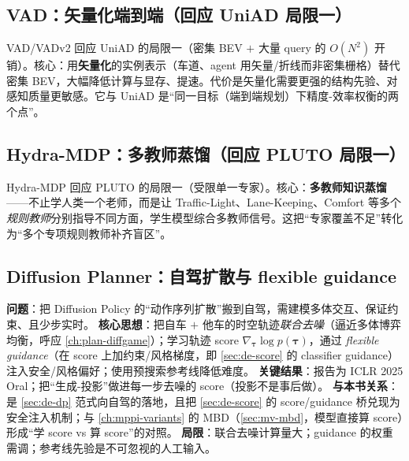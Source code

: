 \subsection{VAD：矢量化端到端（回应 UniAD 局限一）}
\label{sec:de-vad}

VAD/VADv2\cite{jiang2023vad} 回应 UniAD 的局限一（密集 BEV $+$ 大量 query 的 $O(N^2)$ 开销）。核心：用\textbf{矢量化}的实例表示（车道、agent 用矢量/折线而非密集栅格）替代密集 BEV，大幅降低计算与显存、提速。代价是矢量化需要更强的结构先验、对感知质量更敏感。它与 UniAD 是“同一目标（端到端规划）下精度-效率权衡的两个点”。

\subsection{Hydra-MDP：多教师蒸馏（回应 PLUTO 局限一）}
\label{sec:de-hydra}

Hydra-MDP\cite{li2024hydramdp} 回应 PLUTO 的局限一（受限单一专家）。核心：\textbf{多教师知识蒸馏}——不止学人类一个老师，而是让 Traffic-Light、Lane-Keeping、Comfort 等多个\emph{规则教师}分别指导不同方面，学生模型综合多教师信号。这把“专家覆盖不足”转化为“多个专项规则教师补齐盲区”。

\subsection{Diffusion Planner：自驾扩散与 flexible guidance}
\label{sec:de-diffplanner}

\begin{paper}\label{paper:de-diffplanner}
\textbf{问题}：把 Diffusion Policy 的“动作序列扩散”搬到自驾，需建模多体交互、保证约束、且少步实时。
\textbf{核心思想}\cite{zheng2025diffplanner}：把自车 $+$ 他车的时空轨迹\emph{联合去噪}（逼近多体博弈均衡，呼应 \cref{ch:plan-diffgame}）；学习轨迹 score $\nabla_{\boldsymbol{\tau}}\log p(\boldsymbol{\tau})$，通过 \emph{flexible guidance}（在 score 上加约束/风格梯度，即 \cref{sec:de-score} 的 classifier guidance）注入安全/风格偏好；使用预搜索参考线降低难度。
\textbf{关键结果}：报告为 ICLR 2025 Oral；把“生成-投影”做进每一步去噪的 score（投影不是事后做）。
\textbf{与本书关系}：是 \cref{sec:de-dp} 范式向自驾的落地，且把 \cref{sec:de-score} 的 score/guidance 桥兑现为安全注入机制；与 \cref{ch:mppi-variants} 的 MBD（\cref{sec:mv-mbd}，模型直接算 score）形成“学 score vs 算 score”的对照。
\textbf{局限}：联合去噪计算量大；guidance 的权重需调；参考线先验是不可忽视的人工输入。
\end{paper}

